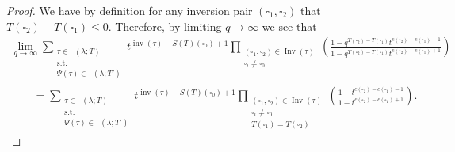 \documentclass[10pt,a4paper]{amsart}
\numberwithin{equation}{section}
\theoremstyle{definition}
\DeclareMathOperator{\PSYT}{\mathrm{PSYT}_{\geq 0}}
\DeclareMathOperator{\Inv}{\mathrm{Inv}}
\DeclareMathOperator{\inv}{inv}
\begin{document}
\begin{proof}
We have by definition for any inversion pair $(\square_1,\square_2)$ that $T(\square_2)- T(\square_1) \leq 0$. Therefore, by limiting $q \rightarrow \infty$ we see that
\begin{gather*}
\lim_{q\rightarrow \infty} \sum_{\substack{\tau \in \PSYT(\lambda;T) \\ \text{s.t.}\\ \Psi(\tau) \in \PSYT(\lambda;T')}} t^{\inv(\tau) -S(T)(\square_0)+1} \prod_{\substack{(\square_1,\square_2) \in \Inv(\tau)\\ \square_i \neq \square_0}} \left( \frac{1 - q^{T(\square_2)-T(\square_1)}t^{c(\square_2)-c(\square_1)-1}}{1 - q^{T(\square_2)-T(\square_1)}t^{c(\square_2)-c(\square_1)+1}} \right) \\
\qquad= \sum_{\substack{\tau \in \PSYT(\lambda;T) \\ \text{s.t.}\\ \Psi(\tau) \in \PSYT(\lambda;T')}} t^{\inv(\tau) -S(T)(\square_0)+1} \prod_{\substack{(\square_1,\square_2) \in \Inv(\tau)\\ \square_i \neq \square_0 \\ T(\square_1)=T(\square_2)}} \left( \frac{1 - t^{c(\square_2)-c(\square_1)-1}}{1 -t^{c(\square_2)-c(\square_1)+1}} \right).
\end{gather*}


\end{proof}
\end{document}
